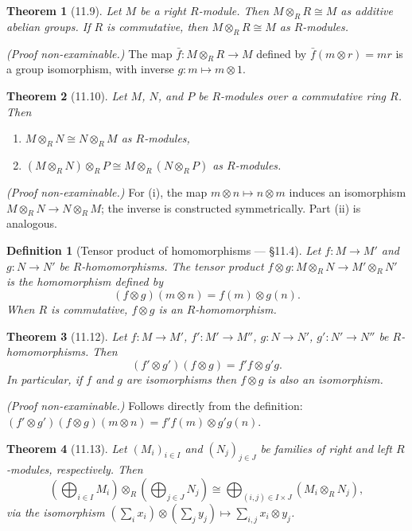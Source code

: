\documentclass[12pt]{article}
\newtheorem{theorem}{Theorem}
\newtheorem{definition}{Definition}
\begin{document}
\begin{theorem}[11.9]
Let $M$ be a right $R$-module. Then $M \otimes_R R \cong M$ as additive abelian groups. If $R$ is commutative, then $M \otimes_R R \cong M$ as $R$-modules.
\end{theorem}

\noindent\textit{(Proof non-examinable.)} The map $\bar{f} : M \otimes_R R \to M$ defined by $\bar{f}(m \otimes r) = mr$ is a group isomorphism, with inverse $g : m \mapsto m \otimes 1$.

\begin{theorem}[11.10]
Let $M$, $N$, and $P$ be $R$-modules over a commutative ring $R$. Then
\begin{enumerate}[label=(\roman*)]
  \item $M \otimes_R N \cong N \otimes_R M$ as $R$-modules,
  \item $(M \otimes_R N) \otimes_R P \cong M \otimes_R (N \otimes_R P)$ as $R$-modules.
\end{enumerate}
\end{theorem}

\noindent\textit{(Proof non-examinable.)} For (i), the map $m \otimes n \mapsto n \otimes m$ induces an isomorphism $M \otimes_R N \to N \otimes_R M$; the inverse is constructed symmetrically. Part (ii) is analogous.

\begin{definition}[{Tensor product of homomorphisms — §11.4}]
Let $f : M \to M'$ and $g : N \to N'$ be $R$-homomorphisms. The \emph{tensor product} $f \otimes g : M \otimes_R N \to M' \otimes_R N'$ is the homomorphism defined by
\[
  (f \otimes g)(m \otimes n) = f(m) \otimes g(n).
\]
When $R$ is commutative, $f \otimes g$ is an $R$-homomorphism.
\end{definition}

\begin{theorem}[11.12]
Let $f : M \to M'$, $f' : M' \to M''$, $g : N \to N'$, $g' : N' \to N''$ be $R$-homomorphisms. Then
\[
  (f' \otimes g')(f \otimes g) = f'f \otimes g'g.
\]
In particular, if $f$ and $g$ are isomorphisms then $f \otimes g$ is also an isomorphism.
\end{theorem}

\noindent\textit{(Proof non-examinable.)} Follows directly from the definition: $(f' \otimes g')(f \otimes g)(m \otimes n) = f'f(m) \otimes g'g(n)$.

\begin{theorem}[11.13]
Let $(M_i)_{i \in I}$ and $(N_j)_{j \in J}$ be families of right and left $R$-modules, respectively. Then
\[
  \left(\bigoplus_{i \in I} M_i\right) \otimes_R \left(\bigoplus_{j \in J} N_j\right) \cong \bigoplus_{(i,j) \in I \times J} (M_i \otimes_R N_j),
\]
via the isomorphism $\left(\sum_i x_i\right) \otimes \left(\sum_j y_j\right) \mapsto \sum_{i,j} x_i \otimes y_j$.
\end{theorem}
\end{document}

